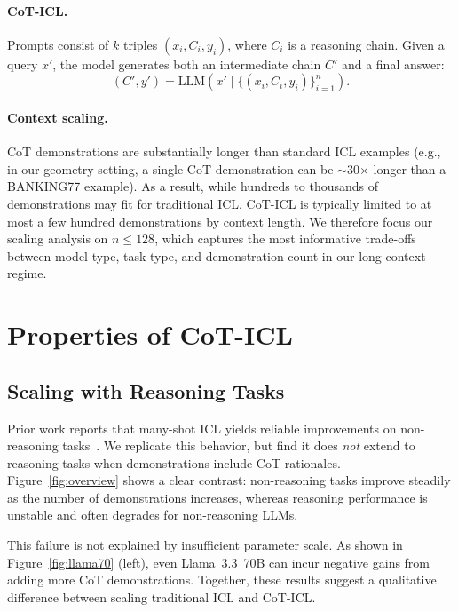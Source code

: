 \documentclass{llmxive}
\begin{document}
\paragraph{CoT-ICL.}
Prompts consist of $k$ triples $(x_i, C_i, y_i)$, where $C_i$ is a reasoning chain.
Given a query $x'$, the model generates both an intermediate chain $C'$ and a final answer:
\begin{equation}
(C', y') = \mathrm{LLM}\!\left(x' \mid \{(x_i, C_i, y_i)\}_{i=1}^n\right).
\end{equation}

\paragraph{Context scaling.}
CoT demonstrations are substantially longer than standard ICL examples (e.g., in our geometry setting, a single CoT demonstration can be $\sim$30$\times$ longer than a BANKING77 example).
As a result, while hundreds to thousands of demonstrations may fit for traditional ICL, CoT-ICL is typically limited to at most a few hundred demonstrations by context length.
We therefore focus our scaling analysis on $n \le 128$, which captures the most informative trade-offs between model type, task type, and demonstration count in our long-context regime.










\section{Properties of CoT-ICL}

\subsection{Scaling with Reasoning Tasks}
\label{sec:scalingtasks}
Prior work reports that many-shot ICL yields reliable improvements on non-reasoning tasks~\cite{bertsch-etal-2025-context, baek2025revisitingincontextlearninglong}. We replicate this behavior, but find it does \emph{not} extend to reasoning tasks when demonstrations include CoT rationales.
Figure~\ref{fig:overview} shows a clear contrast: non-reasoning tasks improve steadily as the number of demonstrations increases, whereas reasoning performance is unstable and often degrades for non-reasoning LLMs.

This failure is not explained by insufficient parameter scale.
As shown in Figure~\ref{fig:llama70} (left), even Llama~3.3~70B can incur negative gains from adding more CoT demonstrations.
Together, these results suggest a qualitative difference between scaling traditional ICL and CoT-ICL.
\end{document}
